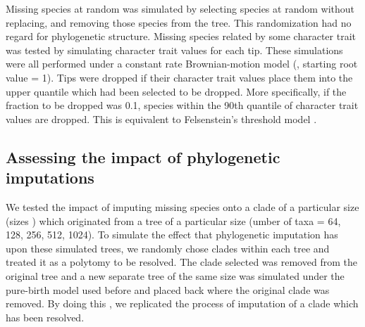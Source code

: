 \documentclass[12pt,english]{article}
\begin{document}
Missing species at random was simulated by selecting species at random
without replacing, and removing those species from the tree. This
randomization had no regard for phylogenetic structure. Missing
species related by some character trait was tested by simulating
character trait values for each tip. These simulations were all
performed under a constant rate Brownian-motion model
(, starting root value = 1).
Tips were dropped if their character trait values place them into the
upper quantile which had been selected to be dropped. More
specifically, if the fraction to be dropped was 0.1, species within
the 90th quantile of character trait values are dropped. This is
equivalent to Felsenstein's threshold model \autocite{Felsenstein2004}
.

\subsection*{Assessing the impact of phylogenetic imputations}
We tested the impact of imputing missing species onto a clade of a
particular size (sizes ) which originated from a tree of a particular size
(umber of taxa = 64, 128, 256, 512, 1024).
To simulate the effect that phylogenetic imputation has upon these
simulated trees, we randomly chose clades within each tree and treated
it as a polytomy to be resolved.
The clade selected was removed from the original tree and a new
separate tree of the same size was simulated under the pure-birth
model used before and placed back where the original clade was
removed.  By doing this
, we replicated the process of imputation of a clade which has been
resolved. 
\end{document}
